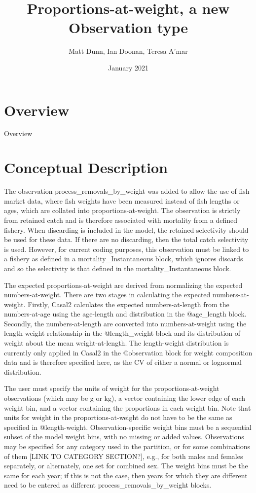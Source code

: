 \documentclass[a4paper,11pt,twoside,pdftex,draft]{article}
\title{Proportions-at-weight, a new Observation type}
\author{Matt Dunn, Ian Doonan, Teresa A'mar}
\date{January 2021}
\begin{document}
\maketitle

\pagestyle{plain}
\setcounter{page}{1}


\newpage

\section{Overview}

Overview

\section{Conceptual Description}

The observation process\_removals\_by\_weight was added to allow the use of fish market data, where fish weights have been measured instead of fish lengths or ages, which are collated into proportions-at-weight. The observation is strictly from retained catch and is therefore associated with mortality from a defined fishery. When discarding is included in the model, the retained selectivity should be used for these data. If there are no discarding, then the total catch selectivity is used. However, for current coding purposes, this observation must be linked to a fishery as defined in a mortality\_Instantaneous block, which ignores discards and so the selectivity is that defined in the mortality\_Instantaneous block.

The expected proportions-at-weight are derived from normalizing the expected numbers-at-weight. There are two stages in calculating the expected numbers-at-weight. Firstly, Casal2 calculates the expected numbers-at-length from the numbers-at-age using the age-length and distribution in the @age\_length block. Secondly, the numbers-at-length are converted into numbers-at-weight using the length-weight relationship in the @length\_weight block and its distribution of weight about the mean weight-at-length. The length-weight distribution is currently only applied in Casal2 in the @observation block for weight composition data and is therefore specified here, as the CV of either a normal or lognormal distribution.

The user must specify the units of weight for the proportions-at-weight observations (which may be g or kg), a vector containing the lower edge of each weight bin, and a vector containing the proportions in each weight bin. Note that units for weight in the proportions-at-weight do not have to be the same as specified in @length-weight. Observation-specific weight bins must be a sequential subset of the model weight bins, with no missing or added values. Observations may be specified for any category used in the partition, or for some combinations of them [LINK TO CATEGORY SECTION?], e.g., for both males and females separately, or alternately, one set for combined sex. The weight bins must be the same for each year; if this is not the case, then years for which they are different need to be entered as different process\_removals\_by\_weight blocks.
\end{document}
